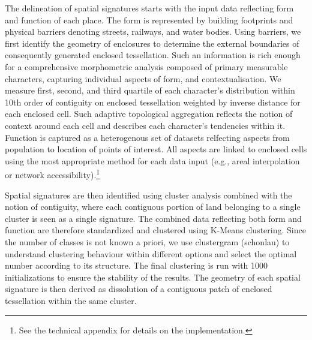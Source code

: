 

The delineation of spatial signatures starts with the input data reflecting form
and function of each place. The form is represented by building footprints and
physical barriers denoting streets, railways, and water bodies.
Using barriers, we first identify the geometry of enclosures to determine the
external boundaries of consequently generated enclosed tessellation.
Such an information is rich enough for a comprehensive morphometric analysis
composed of primary measurable characters, capturing individual aspects of form,
and contextualisation. We measure first, second, and third quartile of each
character's distribution within 10th order of contiguity on enclosed
tessellation weighted by inverse distance for each enclosed cell. Such adaptive
topological aggregation reflects the notion of context around each cell and
describes each character's tendencies within it.
Function is captured as a heterogenous set of datasets relfecting aspects from
population to location of points of interest. All aspects are linked to enclosed
cells using the most appropriate method for each data input (e.g., areal
interpolation or network accessibility).\footnote{See the technical appendix for
details on the implementation.}


Spatial signatures are then identified using cluster analysis combined with the
notion of contiguity, where each contiguous portion of land belonging to a
single cluster is seen as a single signature.
The combined data reflecting both form and function are therefore standardized
and clustered using K-Means clustering. Since the number of classes is not known
a priori, we use clustergram (schonlau) to understand clustering behaviour
within different options and select the optimal number according to its
structure.
The final clustering is run with 1000 initializations to ensure the stability of
the results.
The geometry of each spatial signature is then derived as dissolution of a
contiguous patch of enclosed tessellation within the same cluster.




